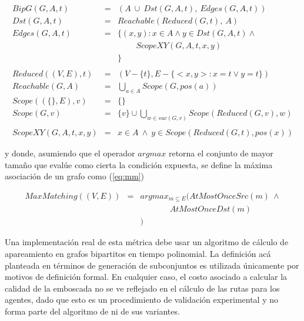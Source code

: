 \begin{small}
\begin{eqnarray}
BipG(G,A,t) & = & 
  (A\ \cup\ Dst(G,A,t),\ Edges(G,A,t)) \label{eq:bipgraph}\\
Dst(G,A,t) & = & Reachable(Reduced(G,t),\ A)\label{eq:bipgraphdst} \\
Edges(G,A,t) & = & \{ (x,y) : x \in A \wedge y \in Dst(G,A,t) \wedge\ \nonumber\\
& & \hspace{27pt} ScopeXY(G,A,t,x,y)\nonumber\\
& & \} \label{eq:bipgraphedges}\\
\nonumber\\
Reduced((V,E), t) & = & (V-\{t\}, E - \{<x,y>: x = t  \vee y = t\})\nonumber\\
Reachable(G,A) &=& \bigcup_{a \in A} Scope(G, pos(a))\nonumber\\
Scope((\{\},E), v) & = & \{\}\nonumber\\
Scope(G, v) & = & \{v\} \cup \bigcup_{w \in suc(G,v)}Scope(Reduced(G,v),w)\nonumber\\
\nonumber\\
ScopeXY(G,A,t,x,y) &=& x \in A \ \wedge\ y \in Scope(Reduced(G,t),pos(x))\nonumber
\end{eqnarray}
\end{small}

\noindent
y donde, asumiendo que el operador $argmax$ retorna el conjunto de mayor
tamaño que eval\'ue como cierta la condici\'on expuesta, se define
la m\'axima asociaci\'on de un grafo como (\ref{eq:mm})

\begin{small}
\begin{eqnarray}
MaxMatching((V,E)) & = & argmax_{m \subseteq E}( AtMostOnceSrc(m)\ \wedge\nonumber\\
				   &   & \hspace{43pt}AtMostOnceDst(m)\nonumber\\
				   &   & )
\label{eq:mm}
\end{eqnarray}
\end{small}

Una implementaci\'on real de esta m\'etrica debe usar un algoritmo de
c\'alculo de apareamiento en grafos bipartitos en tiempo polinomial\cite{Wes01}.
La definici\'on ac\'a planteada en t\'erminos de generaci\'on de subconjuntos
es utilizada \'unicamente por motivos de definici\'on formal. En cualquier caso,
el costo asociado a calcular la calidad de la emboscada no se ve reflejado en
el c\'alculo de las rutas para los agentes, dado que esto es un procedimiento
de validaci\'on experimental y no forma parte del algoritmo de \ambush ni de
sus va\-rian\-tes.
